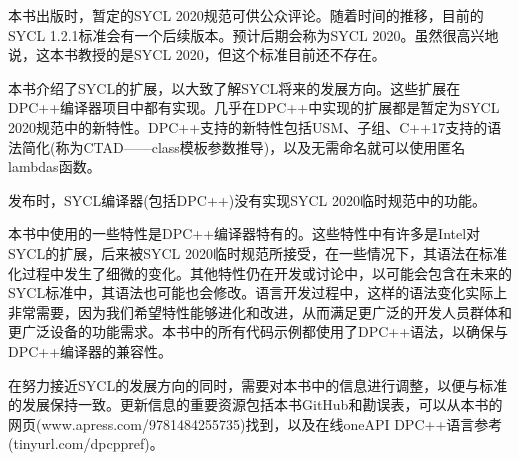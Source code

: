 本书出版时，暂定的SYCL 2020规范可供公众评论。随着时间的推移，目前的SYCL 1.2.1标准会有一个后续版本。预计后期会称为SYCL 2020。虽然很高兴地说，这本书教授的是SYCL 2020，但这个标准目前还不存在。\par

本书介绍了SYCL的扩展，以大致了解SYCL将来的发展方向。这些扩展在DPC++编译器项目中都有实现。几乎在DPC++中实现的扩展都是暂定为SYCL 2020规范中的新特性。DPC++支持的新特性包括USM、子组、C++17支持的语法简化(称为CTAD——class模板参数推导)，以及无需命名就可以使用匿名lambdas函数。\par

发布时，SYCL编译器(包括DPC++)没有实现SYCL 2020临时规范中的功能。\par

本书中使用的一些特性是DPC++编译器特有的。这些特性中有许多是Intel对SYCL的扩展，后来被SYCL 2020临时规范所接受，在一些情况下，其语法在标准化过程中发生了细微的变化。其他特性仍在开发或讨论中，以可能会包含在未来的SYCL标准中，其语法也可能也会修改。语言开发过程中，这样的语法变化实际上非常需要，因为我们希望特性能够进化和改进，从而满足更广泛的开发人员群体和更广泛设备的功能需求。本书中的所有代码示例都使用了DPC++语法，以确保与DPC++编译器的兼容性。\par

在努力接近SYCL的发展方向的同时，需要对本书中的信息进行调整，以便与标准的发展保持一致。更新信息的重要资源包括本书GitHub和勘误表，可以从本书的网页(www.apress.com/9781484255735)找到，以及在线oneAPI DPC++语言参考(tinyurl.com/dpcppref)。\par

















